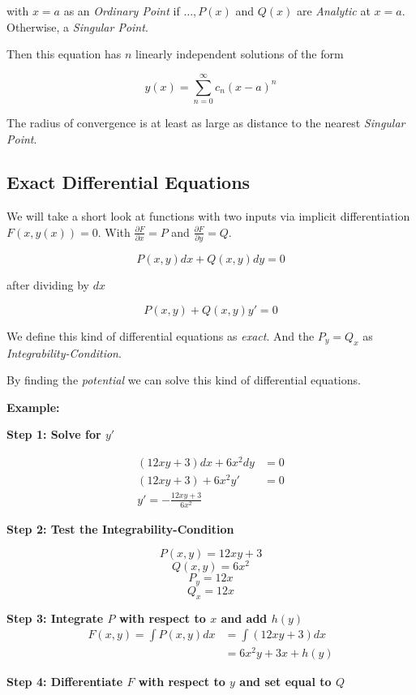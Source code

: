 with \(x = a\) as an \emph{Ordinary Point} if \(\dots, P(x)\) and \(Q(x)\) are 
\emph{Analytic} at \(x = a\). Otherwise, a \emph{Singular Point}.

Then this equation has \(n\) linearly independent solutions of the form

\[
    y(x) = \sum_{n = 0}^{\infty} c_n {(x - a)}^n
\]

The radius of convergence is at least as large as distance to the nearest \emph{Singular Point}.

\subsection{Exact Differential Equations}

We will take a short look at functions with two inputs via implicit differentiation \(F(x,y(x)) = 0\).
With \(\frac{\partial F}{\partial x} = P\) and \(\frac{\partial F}{\partial y} = Q\).

\[
    P(x,y)dx + Q(x,y)dy = 0
\]

after dividing by \(dx\)

\[
    P(x,y)+ Q(x,y)y' = 0
\]

We define this kind of differential equations as \emph{exact}. And the 
\(P_y = Q_x\) as \emph{Integrability-Condition}.

By finding the \emph{potential} we can solve this kind of differential equations.

\textbf{Example:}

\textbf{Step 1: Solve for \(y'\)}

\begin{align*}
    (12xy + 3)dx + 6x^2dy &= 0\\
    (12xy + 3) + 6x^2 y' &= 0\\
    y' = - \frac{12xy + 3}{6x^2}
\end{align*}

\textbf{Step 2: Test the Integrability-Condition}

\[
    P(x,y) = 12xy + 3
\]
\[
    Q(x,y) = 6x^2
\] 
\[
    P_y = 12x
\]
\[
    Q_x = 12x
\]

\textbf{Step 3: Integrate \(P\) with respect to \(x\) and add \(h(y)\)}
\begin{align*}
    F(x,y) = \int P(x,y) dx &= \int (12xy + 3)dx \\
        &= 6x^2 y + 3x + h(y)
\end{align*}

\textbf{Step 4: Differentiate \(F\) with respect to \(y\) and set equal to \(Q\)}

